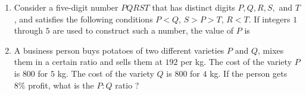 \documentclass[journal]{IEEEtran}
\begin{document}
\begin{enumerate}
    \hfill{}

    \begin{enumerate}
    \end{enumerate}

    \item Consider a five-digit number $PQRST$ that has distinct digits $P, Q, R, S,$ and $T$, and satisfies the following conditions\brak{\text{:}} $P < Q$, $S > P > T$, $R < T$. If integers $1$ through $5$ are used to construct such a number, the value of $P$ is

    \hfill{}

    \begin{enumerate}
    \end{enumerate}

    \item A business person buys potatoes of two different varieties $P$ and $Q$, mixes them in a certain ratio and sells them at \rupee $192$ per kg. The cost of the variety $P$ is \rupee $800$ for $5$ kg. The cost of the variety $Q$ is \rupee $800$ for $4$ kg. If the person gets $8\%$ profit, what is the $P \colon Q$ ratio ?

    \hfill{}

    \begin{enumerate}
    \end{enumerate}


\end{enumerate}
\end{document}
